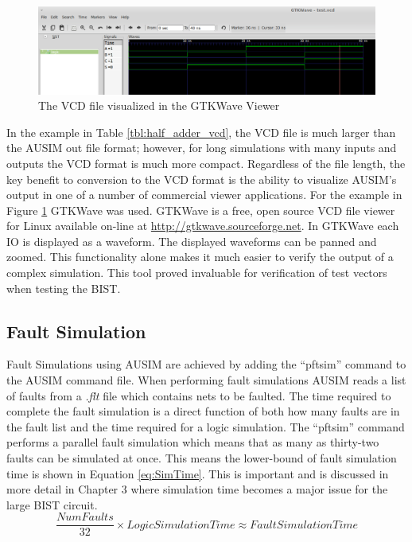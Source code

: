 \documentclass[12pt]{report}
\begin{document}
\begin{figure}
	\begin{center}
		\includegraphics[scale=.4]{images/half-adder-vcd}
	\end{center}
	\caption{The VCD file visualized in the GTKWave Viewer}
	\label{fig:half-adder-gtkwave}
\end{figure}
In the example in Table \ref{tbl:half_adder_vcd}, the VCD file is much larger than the AUSIM out file format; however, for long simulations with many inputs and outputs the VCD format is much more compact.  Regardless of the file length, the key benefit to conversion to the VCD format is the ability to visualize AUSIM's output in one of a number of commercial viewer applications.  For the example in Figure \ref{fig:half-adder-gtkwave} GTKWave was used.  GTKWave is a free, open source VCD file viewer for Linux available on-line at \url{http://gtkwave.sourceforge.net}.  In GTKWave each IO is displayed as a waveform.  The displayed waveforms can be panned and zoomed.  This functionality alone makes it much easier to verify the output of a complex simulation.  This tool proved invaluable for verification of test vectors when testing the BIST.
 
\subsection{Fault Simulation}
\label{sct:ausim-fault}
Fault Simulations using AUSIM are achieved by adding the ``pftsim'' command to the AUSIM command file.  When performing fault simulations AUSIM reads a list of faults from a \textit{.flt} file which contains nets to be faulted\cite{ausim}.  The time required to complete the fault simulation is a direct function of both how many faults are in the fault list and the time required for a logic simulation.  The ``pftsim'' command performs a parallel fault simulation which means that as many as thirty-two faults can be simulated at once.  This means the lower-bound of fault simulation time is shown in Equation \ref{eq:SimTime}.  This is important and is discussed in more detail in Chapter 3 where simulation time becomes a major issue for the large BIST circuit.
\begin{equation}
\frac{NumFaults}{32} \times LogicSimulationTime \approx Fault Simulation Time
\label{eq:SimTime}
\end{equation}
\end{document}

